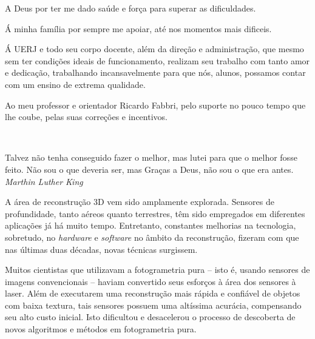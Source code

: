 \documentclass[a4paper,12pt,oneside,onecolumn,final,fleqn]{repUERJ}
\theoremstyle{plain}
\theoremstyle{definition}
\begin{document}


A Deus por ter me dado saúde e força para superar as dificuldades.


Á minha família por sempre me apoiar, até nos momentos mais dificeis.


Á UERJ e todo seu corpo docente, além da direção e administração, que mesmo sem ter condições ideais de funcionamento, realizam seu trabalho com tanto amor e dedicação, trabalhando incansavelmente para que nós, alunos, possamos contar com um ensino de extrema qualidade.


Ao meu professor e orientador Ricardo Fabbri, pelo suporte no pouco tempo que lhe coube, pelas suas correções e incentivos.


\pretextualchapter{}

  \vfill\
  \begin{flushright}
 Talvez não tenha conseguido fazer o melhor, mas lutei para que o melhor fosse feito. Não sou o que deveria ser, mas Graças a Deus, não sou o que era antes. \\
    \textsl{Marthin Luther King}
  \end{flushright}




A área de reconstrução 3D vem sido amplamente explorada. Sensores de
profundidade, tanto aéreos quanto terrestres, têm sido empregados em diferentes
aplicações já há muito tempo. Entretanto, constantes melhorias na tecnologia, sobretudo, no
\emph{hardware} e \emph{software} no âmbito da reconstrução, fizeram com que
nas últimas duas décadas, novas técnicas surgissem.

Muitos cientistas que utilizavam a fotogrametria pura -- isto é, usando sensores de 
imagens convencionais -- haviam convertido seus esforços à área dos sensores à laser. Além de
executarem uma reconstrução mais rápida e confiável de objetos com baixa
textura, tais sensores possuem uma altíssima acurácia, compensando seu alto
custo inicial.  Isto dificultou e desacelerou o processo de descoberta de novos
algoritmos e métodos em fotogrametria pura.
\end{document}
